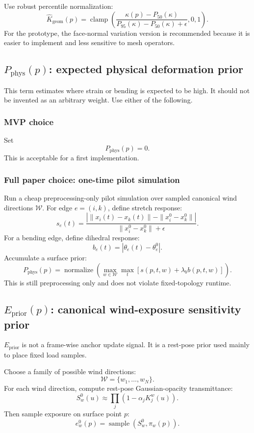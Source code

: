 \documentclass[11pt,a4paper]{article}
\newcommand{\clamp}{\operatorname{clamp}}
\newcommand{\normalize}{\operatorname{normalize}}
\begin{document}
Use robust percentile normalization:
\[
\widehat{K}_{\mathrm{geom}}(p)=
\clamp\left(
\frac{\kappa(p)-P_{50}(\kappa)}{P_{95}(\kappa)-P_{50}(\kappa)+\epsilon},0,1
\right).
\]
For the prototype, the face-normal variation version is recommended because it is easier to implement and less sensitive to mesh operators.

\subsection{$P_{\mathrm{phys}}(p)$: expected physical deformation prior}

This term estimates where strain or bending is expected to be high. It should not be invented as an arbitrary weight. Use either of the following.

\subsubsection{MVP choice}

Set
\[
P_{\mathrm{phys}}(p)=0.
\]
This is acceptable for a first implementation.

\subsubsection{Full paper choice: one-time pilot simulation}

Run a cheap preprocessing-only pilot simulation over sampled canonical wind directions $\mathcal{W}$. For edge $e=(i,k)$, define stretch response:
\[
s_e(t)=\frac{\left|\|x_i(t)-x_k(t)\|-\|x_i^0-x_k^0\|\right|}{\|x_i^0-x_k^0\|+\epsilon}.
\]
For a bending edge, define dihedral response:
\[
b_e(t)=|\theta_e(t)-\theta_e^0|.
\]
Accumulate a surface prior:
\[
P_{\mathrm{phys}}(p)=
\normalize\left(
\max_{w\in\mathcal{W}}\max_t
\left[s(p,t,w)+\lambda_b b(p,t,w)\right]
\right).
\]
This is still preprocessing only and does not violate fixed-topology runtime.

\subsection{$E_{\mathrm{prior}}(p)$: canonical wind-exposure sensitivity prior}

$E_{\mathrm{prior}}$ is not a frame-wise anchor update signal. It is a rest-pose prior used mainly to place fixed load samples.

Choose a family of possible wind directions:
\[
\mathcal{W}=\{w_1,\dots,w_N\}.
\]
For each wind direction, compute rest-pose Gaussian-opacity transmittance:
\[
S_w^0(u)\approx\prod_j\left(1-\alpha_jK_j^w(u)\right).
\]
Then sample exposure on surface point $p$:
\[
e_w^0(p)=\operatorname{sample}(S_w^0,\pi_w(p)).
\]
\end{document}
